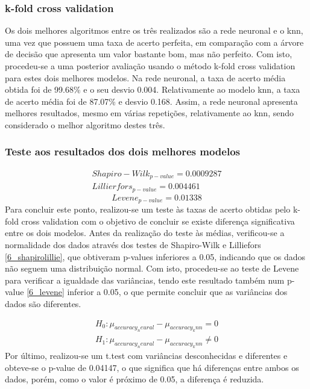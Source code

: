 \documentclass[conference]{IEEEtran}
\begin{document}
\subsubsection{k-fold cross validation}
Os dois melhores algoritmos entre os três realizados são a rede neuronal e o knn, uma vez que possuem uma taxa de acerto perfeita, em comparação com a árvore de decisão que apresenta um valor bastante bom, mas não perfeito.
Com isto, procedeu-se a uma posterior avaliação usando o método k-fold cross validation para estes dois melhores modelos. Na rede neuronal, a taxa de acerto média obtida foi de 99.68\% e o seu desvio 0.004. Relativamente ao modelo knn, a taxa de acerto média foi de 87.07\% e desvio 0.168. Assim, a rede neuronal apresenta melhores resultados, mesmo em várias repetições, relativamente ao knn, sendo considerado o melhor algoritmo destes três.


\subsubsection{Teste aos resultados dos dois melhores modelos}
\begin{equation}
  \begin{array}{l}
	Shapiro-Wilk_{p-value}=0.0009287 \\
	Lillierfors_{p-value}=0.004461
	\end{array}\label{6_shapirolillie}
\end{equation}
\begin{equation}
Levene_{p-value}=0.01338\label{6_levene}
\end{equation}
Para concluir este ponto, realizou-se um teste às taxas de acerto obtidas pelo k-fold cross validation com o objetivo de concluir se existe diferença significativa entre os dois modelos. Antes da realização do teste às médias, verificou-se a normalidade dos dados através dos testes de Shapiro-Wilk e Lilliefors \eqref{6_shapirolillie}, que obtiveram p-values inferiores a 0.05, indicando que os dados não seguem uma distribuição normal. Com isto, procedeu-se ao teste de Levene para verificar a igualdade das variâncias, tendo este resultado também num p-value \eqref{6_levene} inferior a 0.05, o que permite concluir que as variâncias dos dados são diferentes.

\begin{equation}
  \begin{array}{l}
    H_{0}:\mu _{accuracy_neural} - \mu _{accuracy_knn}=0 \\ 
    H_{1}:\mu _{accuracy_neural} - \mu _{accuracy_knn}\neq 0
  \end{array}\label{6_hypothesis}
\end{equation}
Por último, realizou-se um t.test com variâncias desconhecidas e diferentes e obteve-se o p-value de 0.04147, o que significa que há diferenças entre ambos os dados, porém, como o valor é próximo de 0.05, a diferença é reduzida.
\end{document}
